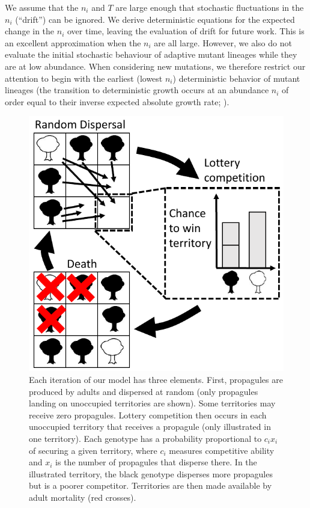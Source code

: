 \documentclass[11pt]{article}
\begin{document}
We assume that the $n_i$ and $T$ are large enough that stochastic fluctuations in the $n_i$ (``drift'') can be ignored. We derive deterministic equations for the expected change in the $n_i$ over time, leaving the evaluation of drift for future work. This is an excellent approximation when the $n_i$ are all large. However, we also do not evaluate the initial stochastic behaviour of adaptive mutant lineages while they are at low abundance. When considering new mutations, we therefore restrict our attention to begin with the earliest (lowest $n_i$) deterministic behavior of mutant lineages (the transition to deterministic growth occurs at an abundance $n_i$ of order equal to their inverse expected absolute growth rate; \citealt{uecker_2011}).

\begin{figure}
\centering
\includegraphics[scale=0.8]{lottery.pdf}
\caption{\label{fig:lottery} Each iteration of our model has three elements. First, propagules are produced by adults and dispersed at random (only propagules landing on unoccupied territories are shown). Some territories may receive zero propagules. Lottery competition then occurs in each unoccupied territory that receives a propagule (only illustrated in one territory). Each genotype has a probability proportional to $c_i x_i$ of securing a given territory, where $c_i$ measures competitive ability and $x_i$ is the number of propagules that disperse there. In the illustrated territory, the black genotype disperses more propagules but is a poorer competitor. Territories are then made available by adult mortality (red crosses).}
\end{figure}
\end{document}
